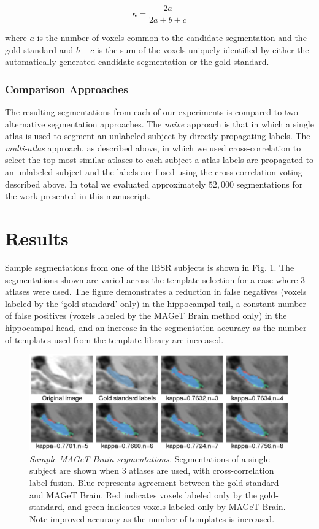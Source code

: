 \documentclass{article}
\begin{document}
\[ \kappa = \frac{2a}{2a+b+c} \]

\noindent where $a$ is the number of voxels common to the candidate
segmentation and the gold standard and $b+c$ is the sum of the voxels
uniquely identified by either the automatically generated candidate
segmentation or the gold-standard.

\subsubsection{Comparison Approaches}
The resulting segmentations from each of our experiments is compared to two
alternative segmentation approaches. The {\it naive} approach is that in  which
a single atlas is used to segment an unlabeled subject by directly propagating
labels.  The {\it multi-atlas} approach, as described above, in which we used
cross-correlation to select the top most similar atlases to each subject a
atlas
labels are propagated to an unlabeled subject and the labels are fused using
the cross-correlation voting described above.  In total we evaluated
approximately $52,000$ segmentations for the work presented in this manuscript.


\section{Results}

Sample segmentations from one of the IBSR subjects is shown in Fig.
\ref{montage}.  The segmentations shown are varied across the template
selection for a case where 3 atlases were used.  The figure demonstrates a
reduction in false negatives (voxels labeled by the `gold-standard' only)
in the hippocampal tail, a constant number of false positives (voxels
labeled by the MAGeT Brain method only) in the hippocampal head, and an
increase in the segmentation accuracy as the number of templates used from
the template library are increased.  

\begin{figure}[h]
\begin{minipage}[b]{1.0\linewidth}
  \centering
  \includegraphics[width=\textwidth]{montage.png}
\end{minipage}
\caption{{\em Sample MAGeT Brain segmentations.} Segmentations of a single
subject are shown when 3 atlases are used, with cross-correlation label
fusion. Blue represents agreement between the gold-standard and MAGeT
Brain.  Red indicates voxels labeled only by the gold-standard, and green
indicates voxels labeled only by MAGeT Brain. Note improved accuracy as the
number of templates is increased.} 
\label{montage}
\end{figure}
\end{document}
